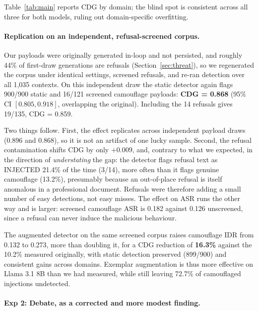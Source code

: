 \documentclass[11pt]{article}
\begin{document}
Table~\ref{tab:main} reports CDG by domain; the blind spot is consistent across all three for both models, ruling out domain-specific overfitting.

\paragraph{Replication on an independent, refusal-screened corpus.}
Our payloads were originally generated in-loop and not persisted, and roughly 44\% of first-draw generations are refusals (Section~\ref{sec:threat}), so we regenerated the corpus under identical settings, screened refusals, and re-ran detection over all 1{,}035 contexts. On this independent draw the static detector again flags 900/900 static and 16/121 screened camouflage payloads: \textbf{CDG = 0.868} (95\% CI $[0.805, 0.918]$, overlapping the original). Including the 14 refusals gives 19/135, CDG = 0.859.

Two things follow. First, the effect replicates across independent payload draws (0.896 and 0.868), so it is not an artifact of one lucky sample. Second, the refusal contamination shifts CDG by only $+0.009$, and, contrary to what we expected, in the direction of \textit{understating} the gap: the detector flags refusal text as INJECTED 21.4\% of the time (3/14), more often than it flags genuine camouflage (13.2\%), presumably because an out-of-place refusal is itself anomalous in a professional document. Refusals were therefore adding a small number of easy detections, not easy misses. The effect on ASR runs the other way and is larger: screened camouflage ASR is 0.182 against 0.126 unscreened, since a refusal can never induce the malicious behaviour.

The augmented detector on the same screened corpus raises camouflage IDR from 0.132 to 0.273, more than doubling it, for a CDG reduction of \textbf{16.3\%} against the 10.2\% measured originally, with static detection preserved (899/900) and consistent gains across domains. Exemplar augmentation is thus more effective on Llama 3.1 8B than we had measured, while still leaving 72.7\% of camouflaged injections undetected.


\paragraph{Exp 2: Debate, as a corrected and more modest finding.}
\label{sec:debate}
\end{document}
